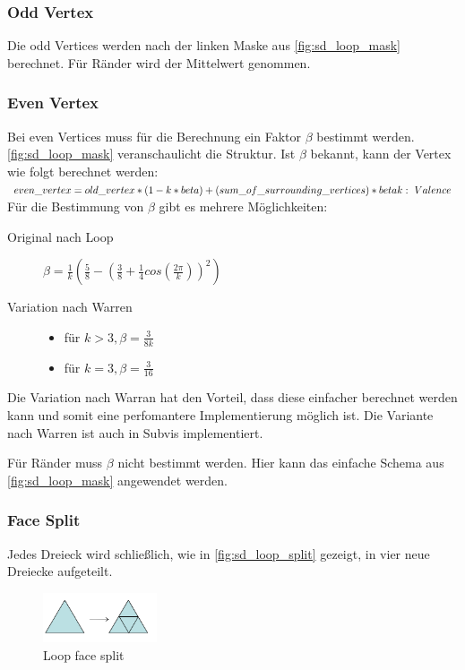 \subsubsection*{Odd Vertex}
Die odd Vertices werden nach der linken Maske aus \autoref{fig:sd_loop_mask} berechnet.
Für Ränder wird der Mittelwert genommen.

\subsubsection*{Even Vertex}

Bei even Vertices muss für die Berechnung ein Faktor \(\beta\) bestimmt werden.
\autoref{fig:sd_loop_mask} veranschaulicht die Struktur.
Ist \(\beta\) bekannt, kann der Vertex wie folgt berechnet werden:\\
\(
even\_vertex = old\_vertex * (1 - k * beta) + (sum\_of\_surrounding\_vertices) * beta\\
k:\ Valence
\)
\\
Für die Bestimmung von \(\beta\) gibt es mehrere Möglichkeiten:
\begin{description}
\item[Original nach Loop]  \(\beta=\frac{1}{k}(\frac{5}{8}-(\frac{3}{8}+\frac{1}{4}cos(\frac{2\pi}{k}))^2)\)
\item[Variation nach Warren] \mbox{}
	\begin{itemize}
		\item für \(k > 3, \beta = \frac{3}{8k}\)
		\item für \(k = 3, \beta = \frac{3}{16}\)	
	\end{itemize}
\end{description}
Die Variation nach Warran hat den Vorteil, dass diese einfacher berechnet werden kann
und somit eine perfomantere Implementierung möglich ist.
Die Variante nach Warren ist auch in Subvis implementiert.

Für Ränder muss \(\beta\) nicht bestimmt werden.
Hier kann das einfache Schema aus \autoref{fig:sd_loop_mask} angewendet werden.
\cite{Carnegie}
\cite{Standford.Loop}
\cite[S. 70f]{Zorin.subdivcourse}

\subsubsection*{Face Split}

Jedes Dreieck wird schließlich, wie in \autoref{fig:sd_loop_split} gezeigt, in vier neue Dreiecke aufgeteilt.

\begin{figure}
\centering
\includegraphics[width=0.3\textwidth]{content/media/sd_loop_split.png}
\caption{Loop face split \cite[S. 56f]{Standford.24.07.2015}}
\label{fig:sd_loop_split}
\end{figure}

